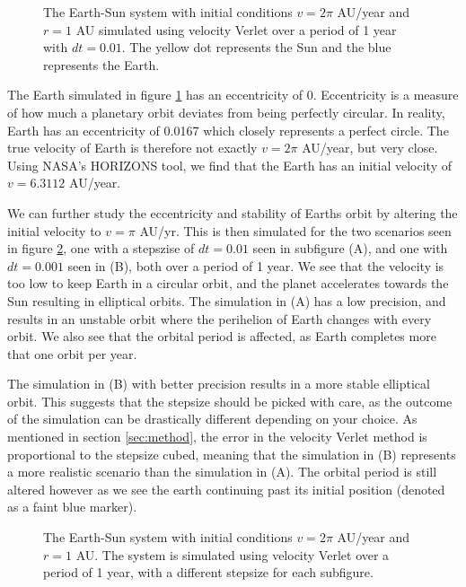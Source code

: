 \documentclass[a4paper, 10pt, reqno]{amsart}
\begin{document}
\begin{figure}
     \centering
     
     \caption{The Earth-Sun system with initial conditions $v = 2 \pi$ AU/year and $r = 1$ AU simulated using velocity Verlet over a period of 1 year with $dt = 0.01$. The yellow dot represents the Sun and the blue represents the Earth. }
     \label{fig:circular}
 \end{figure}
 
The Earth simulated in figure \ref{fig:circular} has an eccentricity of 0. Eccentricity is a measure of how much a planetary orbit deviates from being perfectly circular. In reality, Earth has an eccentricity of 0.0167 \cite{earthfactsheet} which closely represents a perfect circle. The true velocity of Earth is therefore not exactly $v = 2 \pi$ AU/year, but very close. Using NASA's HORIZONS tool, we find that the Earth has an initial velocity of $v = 6.3112$ AU/year.

We can further study the eccentricity and stability of Earths orbit by altering the initial velocity to $v = \pi$ AU/yr. This is then simulated for the two scenarios seen in figure \ref{fig:elliptical_pi}, one with a stepszise of $dt = 0.01$ seen in subfigure (A), and one with $dt = 0.001$ seen in (B), both over a period of 1 year. We see that the velocity is too low to keep Earth in a circular orbit, and the planet accelerates towards the Sun resulting in elliptical orbits. The simulation in (A) has a low precision, and results in an unstable orbit where the perihelion of Earth changes with every orbit. We also see that the orbital period is affected, as Earth completes more that one orbit per year.

The simulation in (B) with better precision results in a more stable elliptical orbit. This suggests that the stepsize should be picked with care, as the outcome of the simulation can be drastically different depending on your choice. As mentioned in section \ref{sec:method}, the error in the velocity Verlet method is proportional to the stepsize cubed, meaning that the simulation in (B) represents a more realistic scenario than the simulation in (A). The orbital period is still altered however as we see the earth continuing past its initial position (denoted as a faint blue marker). 


\begin{figure}
    \centering
    \subfloat[Stepsize $dt = 0.01$]{ }
    \subfloat[Stepsize $dt = 0.001$]{ }
    \caption{The Earth-Sun system with initial conditions $v = 2 \pi$ AU/year and $r = 1$ AU. The system is simulated using velocity Verlet over a period of 1 year, with a different stepsize for each subfigure. }
    \label{fig:elliptical_pi}
\end{figure}
\end{document}
